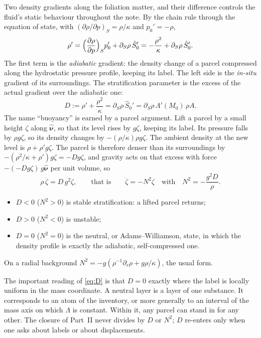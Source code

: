 \documentclass[11pt]{article}
\theoremstyle{definition}
\theoremstyle{remark}
\newcommand{\nuh}{\hat{\boldsymbol{\nu}}}
\begin{document}
Two density gradients along the foliation matter, and their
difference controls the fluid's static behaviour throughout the note.
By the chain rule through the equation of state, with $(\partial\rho/
\partial p)_S = \rho/\kappa$ and $p_0' = -\rho$,
\begin{equation*}
  \rho' = \Bigl(\frac{\partial\rho}{\partial p}\Bigr)_S p_0'
  + \partial_S\rho\,\hat S_0'
  = -\frac{\rho^2}{\kappa} + \partial_S\rho\,\hat S_0' .
\end{equation*}
The first term is the \emph{adiabatic} gradient: the density change of
a parcel compressed along the hydrostatic pressure profile, keeping
its label. The left side is the \emph{in-situ} gradient of its
surroundings. The stratification parameter is the excess of the
actual gradient over the adiabatic one:
\begin{equation}
  D := \rho' + \frac{\rho^2}{\kappa}
  = \partial_S\rho\,\hat S_0'
  = \partial_S\rho\,\Lambda'(M_0)\,\rho A .
  \label{eq:D}
\end{equation}
The name ``buoyancy'' is earned by a parcel argument. Lift a parcel by
a small height $\zeta$ along $\nuh$, so that its level rises by
$g\zeta$, keeping its label. Its pressure falls by $\rho g\zeta$, so
its density changes by $-(\rho/\kappa)\rho g\zeta$. The ambient density
at the new level is $\rho + \rho' g\zeta$. The parcel is therefore
denser than its surroundings by $-(\rho^2/\kappa + \rho')g\zeta =
-Dg\zeta$, and gravity acts on that excess with force $-(-Dg\zeta)\,
g\nuh$ per unit volume, so
\begin{equation*}
  \rho\,\ddot\zeta = D\,g^2\zeta,
  \qquad\text{that is}\qquad
  \ddot\zeta = -N^2\zeta
  \quad\text{with}\quad
  N^2 = -\frac{g^2D}{\rho} .
\end{equation*}
\begin{itemize}
\item $D < 0$ ($N^2 > 0$) is stable stratification: a lifted parcel
  returns;
\item $D > 0$ ($N^2 < 0$) is unstable;
\item $D = 0$ ($N^2 = 0$) is the neutral, or Adams--Williamson, state,
  in which the density profile is exactly the adiabatic,
  self-compressed one.
\end{itemize}
On a radial background $N^2 = -g(\rho^{-1}\partial_r\rho +
g\rho/\kappa)$, the usual form.

The important reading of \eqref{eq:D} is that $D = 0$ exactly where the
label is locally uniform in the mass coordinate. A neutral layer is a
layer of one substance. It corresponds to an atom of the inventory, or
more generally to an interval of the mass axis on which $\Lambda$ is
constant. Within it, any parcel can stand in for any other. The
closure of Part~II never divides by $D$ or $N^2$; $D$ re-enters only
when one asks about labels or about displacements.
\end{document}
